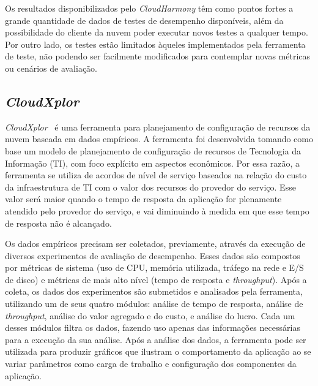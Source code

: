 Os resultados disponibilizados pelo {\em CloudHarmony} têm como pontos fortes a
grande quantidade de dados de testes de desempenho disponíveis, além da possibilidade do cliente da
nuvem poder executar novos testes a qualquer tempo. Por outro lado, os testes estão limitados àqueles implementados pela ferramenta de teste, não podendo ser facilmente modificados para contemplar novas métricas ou cenários de avaliação.

\subsection{{\em CloudXplor}}

{\em CloudXplor}~\cite{malkowski2010cloudxplor} é uma ferramenta para
planejamento de configuração de recursos da nuvem baseada em dados empíricos. A ferramenta
foi desenvolvida tomando como base um modelo de planejamento de configuração de
recursos de Tecnologia da Informação (TI), com foco explícito em aspectos econômicos.
Por essa razão, a ferramenta se utiliza de acordos de nível de serviço baseados na relação do custo
da infraestrutura de TI com o valor dos recursos do provedor do serviço. Esse
valor será maior quando o tempo de resposta da aplicação for plenamente atendido
pelo provedor do serviço, e vai diminuindo à medida em que esse tempo de resposta
não é alcançado.

Os dados empíricos precisam ser coletados, previamente, através da execução de diversos experimentos de avaliação de desempenho. Esses dados
são compostos por métricas de sistema (uso de CPU, memória utilizada, tráfego na rede e E/S de disco) e métricas de mais alto nível (tempo de resposta e \textit{throughput}). Após a coleta, os dados dos experimentos são submetidos e analisados pela ferramenta, utilizando um de seus quatro módulos: análise de tempo de
resposta, análise de \textit{throughput}, análise do valor agregado e do custo,
e análise do lucro. Cada um desses módulos filtra os dados, fazendo uso apenas
das informações necessárias para a execução da sua análise. Após a análise dos
 dados, a ferramenta pode ser utilizada para produzir gráficos que ilustram o comportamento da aplicação ao se variar
parâmetros como carga de trabalho e configuração dos componentes da aplicação.


